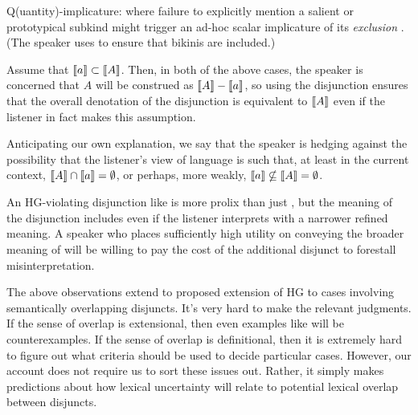\documentclass{article}
\begin{document}
\begin{examples}
\begin{examples}
  \item Q(uantity)-implicature: where failure to explicitly mention a
    salient or prototypical subkind might trigger an ad-hoc scalar
    implicature of its \emph{exclusion} \citep{hirschberg:1985}. (The
    speaker uses  to ensure that bikinis are
    included.)
  \end{examples}

\item Assume that $\llbracket a\rrbracket \subset \llbracket A\rrbracket$. Then, in both of the
  above cases, the speaker is concerned that $A$ will be construed as
  $\llbracket A\rrbracket-\llbracket a\rrbracket$, so using the disjunction ensures that the overall
  denotation of the disjunction is equivalent to $\llbracket A\rrbracket$ even if the
  listener in fact makes this assumption.

\item Anticipating our own explanation, we say that the speaker is
  hedging against the possibility that the listener's view of language
  is such that, at least in the current context, $\llbracket A\rrbracket \cap \llbracket a\rrbracket
  = \emptyset$, or perhaps, more weakly, $ \llbracket a\rrbracket \nsubseteq \llbracket A\rrbracket
  = \emptyset$.

\item An HG-violating disjunction like  is more
  prolix than just , but the meaning of the disjunction
  includes  even if the listener interprets 
  with a narrower refined meaning.  A speaker who places sufficiently
  high utility on conveying the broader meaning of  will be
  willing to pay the cost of the additional disjunct to forestall
  misinterpretation.

\item The above observations extend to  proposed
  extension of HG to cases involving semantically overlapping
  disjuncts. It's very hard to make the relevant judgments.  If the
  sense of overlap is extensional, then even examples like
   will be counterexamples. If the sense of
  overlap is definitional, then it is extremely hard to figure out
  what criteria should be used to decide particular cases. However,
  our account does not require us to sort these issues out. Rather, it
  simply makes predictions about how lexical uncertainty will relate
  to potential lexical overlap between disjuncts.
\end{examples}
 
\end{document}
